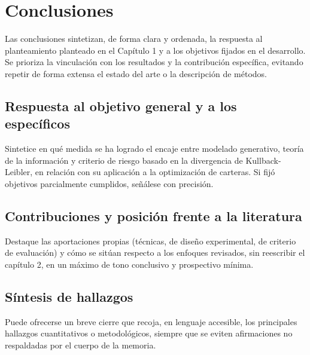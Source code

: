\chapter{Conclusiones}

Las conclusiones sintetizan, de forma clara y ordenada, la respuesta al planteamiento planteado en el Capítulo 1 y a los objetivos fijados en el desarrollo. Se prioriza la vinculación con los resultados y la contribución específica, evitando repetir de forma extensa el estado del arte o la descripción de métodos.

\section{Respuesta al objetivo general y a los específicos}
Sintetice en qué medida se ha logrado el encaje entre modelado generativo, teoría de la información y criterio de riesgo basado en la divergencia de Kullback-Leibler, en relación con su aplicación a la optimización de carteras. Si fijó objetivos parcialmente cumplidos, señálese con precisión.

\section{Contribuciones y posición frente a la literatura}
Destaque las aportaciones propias (técnicas, de diseño experimental, de criterio de evaluación) y cómo se sitúan respecto a los enfoques revisados, sin reescribir el capítulo 2, en un máximo de tono conclusivo y prospectivo mínima.

\section{Síntesis de hallazgos}
Puede ofrecerse un breve cierre que recoja, en lenguaje accesible, los principales hallazgos cuantitativos o metodológicos, siempre que se eviten afirmaciones no respaldadas por el cuerpo de la memoria.
